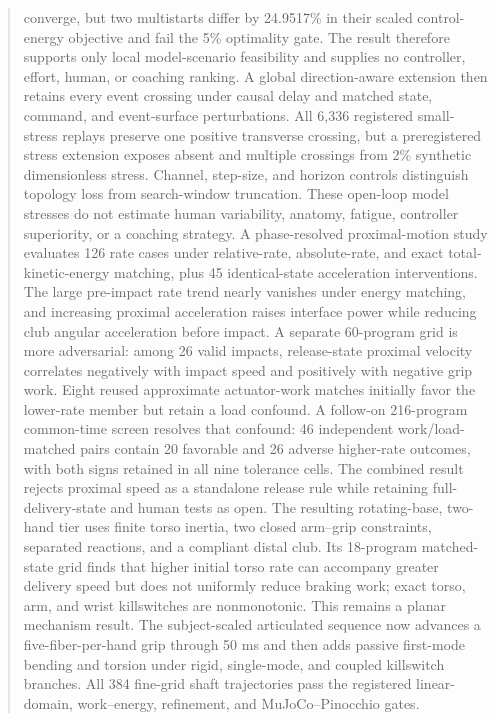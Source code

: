 \documentclass[
  letterpaper,
]{report}
\begin{document}
\begin{abstract}
converge, but two multistarts differ by 24.9517\% in their scaled
control-energy objective and fail the 5\% optimality gate. The result
therefore supports only local model-scenario feasibility and supplies no
controller, effort, human, or coaching ranking. A global direction-aware
extension then retains every event crossing under causal delay and
matched state, command, and event-surface perturbations. All 6,336
registered small-stress replays preserve one positive transverse
crossing, but a preregistered stress extension exposes absent and
multiple crossings from 2\% synthetic dimensionless stress. Channel,
step-size, and horizon controls distinguish topology loss from
search-window truncation. These open-loop model stresses do not estimate
human variability, anatomy, fatigue, controller superiority, or a
coaching strategy. A phase-resolved proximal-motion study evaluates 126
rate cases under relative-rate, absolute-rate, and exact
total-kinetic-energy matching, plus 45 identical-state acceleration
interventions. The large pre-impact rate trend nearly vanishes under
energy matching, and increasing proximal acceleration raises interface
power while reducing club angular acceleration before impact. A separate
60-program grid is more adversarial: among 26 valid impacts,
release-state proximal velocity correlates negatively with impact speed
and positively with negative grip work. Eight reused approximate
actuator-work matches initially favor the lower-rate member but retain a
load confound. A follow-on 216-program common-time screen resolves that
confound: 46 independent work/load-matched pairs contain 20 favorable
and 26 adverse higher-rate outcomes, with both signs retained in all
nine tolerance cells. The combined result rejects proximal speed as a
standalone release rule while retaining full-delivery-state and human
tests as open. The resulting rotating-base, two-hand tier uses finite
torso inertia, two closed arm--grip constraints, separated reactions,
and a compliant distal club. Its 18-program matched- state grid finds
that higher initial torso rate can accompany greater delivery speed but
does not uniformly reduce braking work; exact torso, arm, and wrist
killswitches are nonmonotonic. This remains a planar mechanism result.
The subject-scaled articulated sequence now advances a
five-fiber-per-hand grip through 50 ms and then adds passive first-mode
bending and torsion under rigid, single-mode, and coupled killswitch
branches. All 384 fine-grid shaft trajectories pass the registered
linear-domain, work--energy, refinement, and MuJoCo--Pinocchio gates.

\end{abstract}
\end{document}
